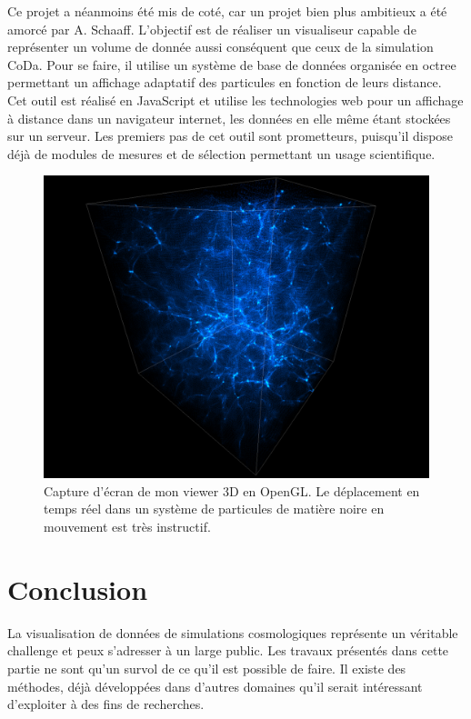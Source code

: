 Ce projet a néanmoins été mis de coté, car un projet bien plus ambitieux a été amorcé par A. Schaaff.
L'objectif est de réaliser un visualiseur capable de représenter un volume de donnée aussi conséquent que ceux de la simulation CoDa.
Pour se faire, il utilise un système de base de données organisée en octree permettant un affichage adaptatif des particules en fonction de leurs distance.
Cet outil est réalisé en JavaScript et utilise les technologies web pour un affichage à distance dans un navigateur internet, les données en elle même étant stockées sur un serveur.
Les premiers pas de cet outil sont prometteurs, puisqu'il dispose déjà de modules de mesures et de sélection permettant un usage scientifique.




\begin{figure}
        \includegraphics[width=.95\linewidth]{img/04/part.png} 
        \caption[Projection 3D]{Capture d’écran de mon viewer 3D en OpenGL.
        Le déplacement en temps réel dans un système de particules de matière noire en mouvement est très instructif.}
 		\label{fig:viewer}
\end{figure}


\section{Conclusion}

La visualisation de données de simulations cosmologiques représente un véritable challenge et peux s'adresser à un large public.
Les travaux présentés dans cette partie ne sont qu'un survol de ce qu'il est possible de faire.
Il existe des méthodes, déjà développées dans d'autres domaines qu'il serait intéressant d'exploiter à des fins de recherches.



